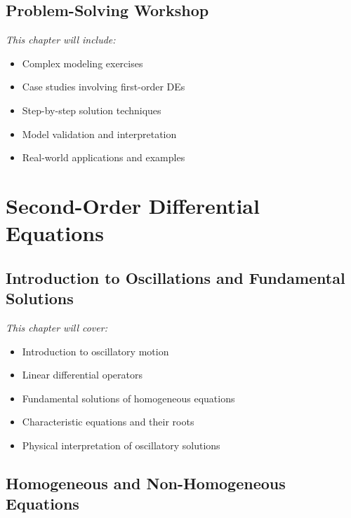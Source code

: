 \documentclass[12pt, letterpaper]{book}
\begin{document}
\chapter{Problem-Solving Workshop}
\label{chap:session_4}

\textit{This chapter will include:}
\begin{itemize}
    \item Complex modeling exercises
    \item Case studies involving first-order DEs
    \item Step-by-step solution techniques
    \item Model validation and interpretation
    \item Real-world applications and examples
\end{itemize}

\part{Second-Order Differential Equations}
\label{part:second_order_de}

\chapter{Introduction to Oscillations and Fundamental Solutions}
\label{chap:session_5}

\textit{This chapter will cover:}
\begin{itemize}
    \item Introduction to oscillatory motion
    \item Linear differential operators
    \item Fundamental solutions of homogeneous equations
    \item Characteristic equations and their roots
    \item Physical interpretation of oscillatory solutions
\end{itemize}

\chapter{Homogeneous and Non-Homogeneous Equations}
\label{chap:session_6}
\end{document}
